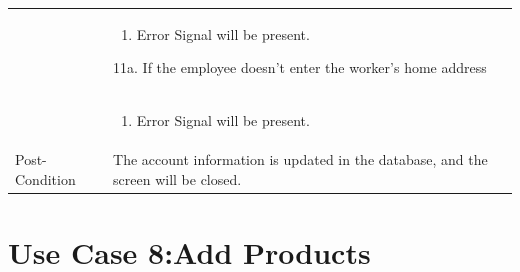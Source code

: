 \documentclass[12pt,a4paper]{report}
\begin{document}
\begin{tabular}{ | m{3cm} | m{12cm}| }
&	\begin{enumerate}
		\item Error Signal will be present.
	\end{enumerate}
11a. If the employee doesn't enter the worker's home address\\ 	
&	\begin{enumerate}
		\item Error Signal will be present.
	\end{enumerate}
\\ \hline
Post-Condition & The account information is updated in the database, and the screen will be closed.\\\hline
\end{tabular}
\section{Use Case 8:Add Products}
\end{document}
